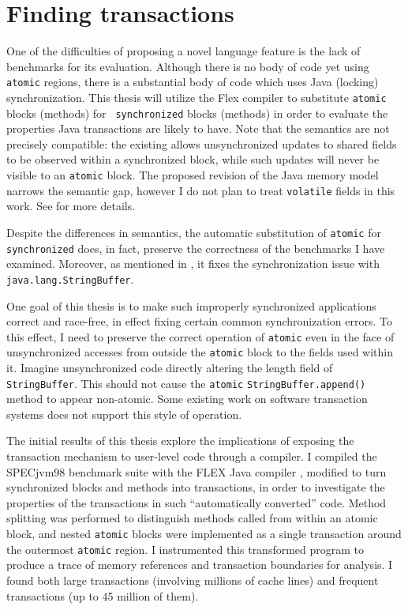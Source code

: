 \section{Finding transactions}\label{sec:auto}
One of the difficulties of proposing a novel language feature is the
lack of benchmarks for its evaluation.  Although there is no body of
code yet using {\tt atomic} regions, there is a substantial body of
code which uses Java (locking) synchronization.  This thesis will
utilize the Flex compiler to
substitute {\tt atomic} blocks (methods) for {\tt
  synchronized} blocks (methods) in order to evaluate the properties
Java transactions are likely to have.  Note that the semantics are not
precisely compatible: the existing  allows
unsynchronized updates to shared fields to be observed within a
synchronized block, while such updates will never be visible to an
{\tt atomic} block.  The proposed revision of the Java memory model
\cite{MansonPu02} narrows the semantic gap, however I do not
plan to treat {\tt volatile} fields in this work.  See
 for more details.

Despite the differences in semantics, the automatic substitution of
{\tt atomic} for {\tt synchronized} does, in fact, preserve the
correctness of the benchmarks I have examined.  Moreover, as
mentioned in , it
fixes the synchronization issue with {\tt java.lang.StringBuffer}.

One goal of this thesis is to make such improperly synchronized
applications correct and race-free, in effect fixing certain common
synchronization errors.  To this effect, I need to preserve the
correct operation of {\tt atomic} even in the face of unsynchronized
accesses from outside the {\tt atomic} block to the fields used within
it.  Imagine unsynchronized code directly altering the length field of
{\tt StringBuffer}.  This should not cause the {\tt atomic}
{\tt StringBuffer.append()} method to appear non-atomic.
Some existing work on software transaction systems \cite{HarrisFr03}
does not support this style of operation.

\label{sec:properties}
The initial results of this thesis
explore the implications of exposing the transaction
mechanism to user-level code through a compiler.
I compiled the SPECjvm98 benchmark suite with the FLEX Java compiler
\cite{Flex},
modified to turn synchronized blocks and methods into transactions,
in order to investigate the properties of the transactions in such
``automatically converted'' code.
Method splitting was performed to distinguish methods called from
within an atomic block, and nested
\texttt{atomic} blocks were implemented as a single
transaction around the outermost \texttt{atomic} region.  I
instrumented this transformed program to produce a trace of
memory references and transaction boundaries for analysis.
I found both large
transactions (involving millions of cache lines) and frequent
transactions (up to 45 million of them).

